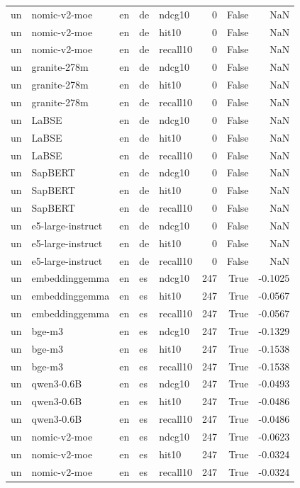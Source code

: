 \begin{tabular}{lllllrrr}
un & nomic-v2-moe & en & de & ndcg10 & 0 & False & NaN \\
un & nomic-v2-moe & en & de & hit10 & 0 & False & NaN \\
un & nomic-v2-moe & en & de & recall10 & 0 & False & NaN \\
un & granite-278m & en & de & ndcg10 & 0 & False & NaN \\
un & granite-278m & en & de & hit10 & 0 & False & NaN \\
un & granite-278m & en & de & recall10 & 0 & False & NaN \\
un & LaBSE & en & de & ndcg10 & 0 & False & NaN \\
un & LaBSE & en & de & hit10 & 0 & False & NaN \\
un & LaBSE & en & de & recall10 & 0 & False & NaN \\
un & SapBERT & en & de & ndcg10 & 0 & False & NaN \\
un & SapBERT & en & de & hit10 & 0 & False & NaN \\
un & SapBERT & en & de & recall10 & 0 & False & NaN \\
un & e5-large-instruct & en & de & ndcg10 & 0 & False & NaN \\
un & e5-large-instruct & en & de & hit10 & 0 & False & NaN \\
un & e5-large-instruct & en & de & recall10 & 0 & False & NaN \\
un & embeddinggemma & en & es & ndcg10 & 247 & True & -0.1025 \\
un & embeddinggemma & en & es & hit10 & 247 & True & -0.0567 \\
un & embeddinggemma & en & es & recall10 & 247 & True & -0.0567 \\
un & bge-m3 & en & es & ndcg10 & 247 & True & -0.1329 \\
un & bge-m3 & en & es & hit10 & 247 & True & -0.1538 \\
un & bge-m3 & en & es & recall10 & 247 & True & -0.1538 \\
un & qwen3-0.6B & en & es & ndcg10 & 247 & True & -0.0493 \\
un & qwen3-0.6B & en & es & hit10 & 247 & True & -0.0486 \\
un & qwen3-0.6B & en & es & recall10 & 247 & True & -0.0486 \\
un & nomic-v2-moe & en & es & ndcg10 & 247 & True & -0.0623 \\
un & nomic-v2-moe & en & es & hit10 & 247 & True & -0.0324 \\
un & nomic-v2-moe & en & es & recall10 & 247 & True & -0.0324 \\

\end{tabular}
